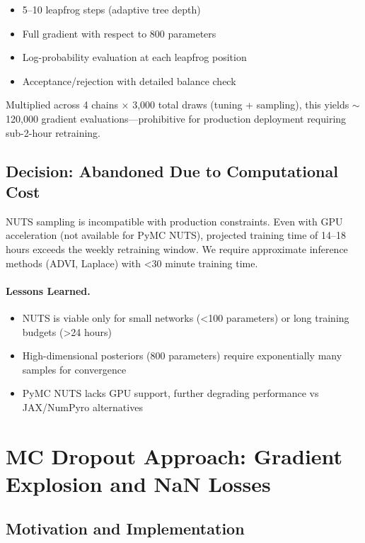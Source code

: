 \begin{itemize}
  \item 5--10 leapfrog steps (adaptive tree depth)
  \item Full gradient with respect to 800 parameters
  \item Log-probability evaluation at each leapfrog position
  \item Acceptance/rejection with detailed balance check
\end{itemize}

Multiplied across 4 chains × 3,000 total draws (tuning + sampling), this yields $\sim$120,000 gradient evaluations—prohibitive for production deployment requiring sub-2-hour retraining.

\subsection{Decision: Abandoned Due to Computational Cost}

NUTS sampling is incompatible with production constraints. Even with GPU acceleration (not available for PyMC NUTS), projected training time of 14--18 hours exceeds the weekly retraining window. We require approximate inference methods (ADVI, Laplace) with <30 minute training time.

\paragraph{Lessons Learned.}
\begin{itemize}
  \item NUTS is viable only for small networks (<100 parameters) or long training budgets (>24 hours)
  \item High-dimensional posteriors (800 parameters) require exponentially many samples for convergence
  \item PyMC NUTS lacks GPU support, further degrading performance vs JAX/NumPyro alternatives
\end{itemize}

\section{MC Dropout Approach: Gradient Explosion and NaN Losses}

\subsection{Motivation and Implementation}

